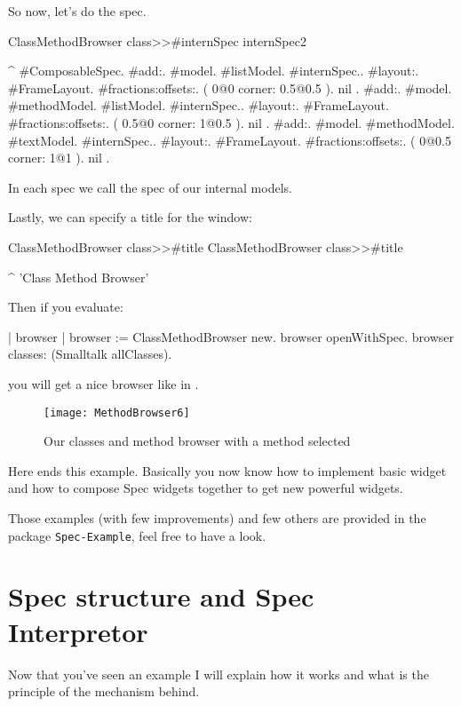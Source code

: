 \documentclass[a4paper,10pt,twoside]{book}
\begin{document}
So now, let's do the spec. 
\begin{method}{ClassMethodBrowser class>>\#internSpec}
internSpec2

	^ { #ComposableSpec.
			#add:. {{#model. #listModel. #internSpec.}.
						#layout:. {#FrameLayout.
									#fractions:offsets:. 	( 0@0 corner: 0.5@0.5 ). nil }}.
			#add:. {{#model. #methodModel.  #listModel. #internSpec.}.
						#layout:. {#FrameLayout.
									#fractions:offsets:. 	( 0.5@0 corner: 1@0.5 ). nil }}.
			#add:. {{#model. #methodModel.  #textModel. #internSpec.}.
						#layout:. {#FrameLayout.
									#fractions:offsets:. 	( 0@0.5 corner: 1@1 ). nil }}}.
\end{method}
In each spec we call the spec of our internal models.

Lastly, we can specify a title for the window:
\begin{method}{ClassMethodBrowser class>>\#title}
ClassMethodBrowser class>>#title

	^ 'Class Method Browser'
\end{method}

Then if you evaluate:

\begin{code}{}
| browser |
browser := ClassMethodBrowser new.
browser openWithSpec.
browser classes: (Smalltalk allClasses).
\end{code}

you will get a nice browser like in .


\begin{figure}[ht]
\begin{center}
	\texttt{[image: MethodBrowser6]}
	\caption{Our classes and method browser with a method selected}
\end{center}
\end{figure}


Here ends this example. 
Basically you now know how to implement basic widget and how to compose Spec widgets together to get new powerful widgets.

Those examples (with few improvements) and few others are provided in the package \verb+Spec-Example+, feel free to have a look.

\section{Spec structure and Spec Interpretor}

Now that you've seen an example I will explain how it works and what is the principle of the mechanism behind.
\end{document}
